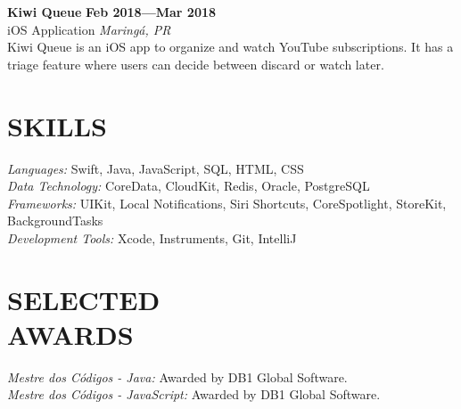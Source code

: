 \documentclass[line,margin]{res}
\begin{document}
\begin{resume}
  {\bf Kiwi Queue} \hfill {\bf Feb 2018---Mar 2018} \\
  iOS Application \hfill {\sl Maring\'a, PR}\\[6pt]
  Kiwi Queue is an iOS app to organize and watch YouTube subscriptions.
  It has a triage feature where users can decide between discard or watch later.


\section{SKILLS}
  {\sl Languages:} Swift, Java, JavaScript, SQL, HTML, CSS \\
  {\sl Data Technology:} CoreData, CloudKit, Redis, Oracle, PostgreSQL \\
  {\sl Frameworks:} UIKit, Local Notifications, Siri Shortcuts, CoreSpotlight, StoreKit, BackgroundTasks \\
  {\sl Development Tools:} Xcode, Instruments, Git, IntelliJ


\section{SELECTED \\ AWARDS}             
  {\sl Mestre dos C\'odigos - Java:} Awarded by DB1 Global Software.\\
  {\sl Mestre dos C\'odigos - JavaScript:} Awarded by DB1 Global Software.\\
 

\end{resume}
\end{document}
